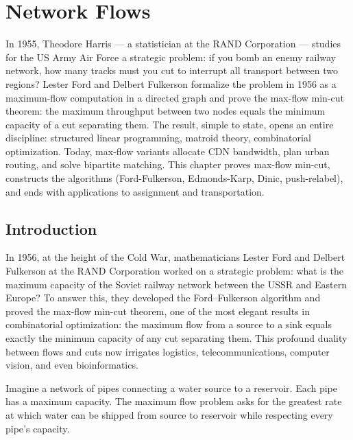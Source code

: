 \chapter{Network Flows}
\label{ch:flows}

In 1955, Theodore Harris --- a statistician at the RAND Corporation --- studies for the US Army Air Force a strategic problem: if you bomb an enemy railway network, how many tracks must you cut to interrupt all transport between two regions? Lester Ford and Delbert Fulkerson formalize the problem in 1956 as a maximum-flow computation in a directed graph and prove the max-flow min-cut theorem: the maximum throughput between two nodes equals the minimum capacity of a cut separating them. The result, simple to state, opens an entire discipline: structured linear programming, matroid theory, combinatorial optimization. Today, max-flow variants allocate CDN bandwidth, plan urban routing, and solve bipartite matching. This chapter proves max-flow min-cut, constructs the algorithms (Ford-Fulkerson, Edmonds-Karp, Dinic, push-relabel), and ends with applications to assignment and transportation.

\section{Introduction}

In 1956, at the height of the Cold War, mathematicians Lester Ford and Delbert Fulkerson at the RAND Corporation worked on a strategic problem: what is the maximum capacity of the Soviet railway network between the USSR and Eastern Europe? To answer this, they developed the Ford--Fulkerson algorithm and proved the max-flow min-cut theorem, one of the most elegant results in combinatorial optimization: the maximum flow from a source to a sink equals exactly the minimum capacity of any cut separating them. This profound duality between flows and cuts now irrigates logistics, telecommunications, computer vision, and even bioinformatics.

\begin{intuition}
Imagine a network of pipes connecting a water source to a reservoir. Each pipe
has a maximum capacity. The maximum flow problem asks for the greatest rate at
which water can be shipped from source to reservoir while respecting every
pipe's capacity.
\end{intuition}

